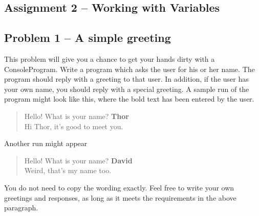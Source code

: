 \documentclass[11pt]{article}
\theoremstyle{plain}
\theoremstyle{definition}
\theoremstyle{remark}
\begin{document}
\begin{center}
\section*{Assignment 2 -- Working with Variables}
\end{center}
\subsection*{Problem 1 -- A simple greeting}
This problem will give you a chance to get your hands dirty with a
ConsoleProgram. Write a program which asks the user for his or her name. The
program should reply with a greeting to that user. In addition, if the user has
your own name, you should reply with a special greeting. A sample run of the
program might look like this, where the bold text has been entered by the user.
\begin{quote}
  Hello! What is your name? \textbf{Thor}\\
  Hi Thor, it's good to meet you.
\end{quote}
Another run might appear
\begin{quote}
  Hello! What is your name? \textbf{David}\\
  Weird, that's my name too.
\end{quote}
You do not need to copy the wording exactly. Feel free to write your own
greetings and responses, as long as it meets the requirements in the above
paragraph.
\end{document}
